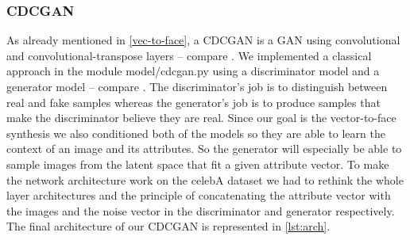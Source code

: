 \documentclass[12pt, a4paper]{article}
\begin{document}
\subsubsection{CDCGAN}
As already mentioned in \ref{vec-to-face}, a CDCGAN is a GAN using convolutional and convolutional-transpose layers
-- compare \cite{dcgan}.
We implemented a classical approach in the module model/cdcgan.py using a discriminator model and a generator model --
compare \cite{gan}.
The discriminator's job is to distinguish between real and fake samples whereas the generator's job is to produce samples
that make the discriminator believe they are real.
Since our goal is the vector-to-face synthesis we also conditioned both of the models so they are able to learn the
context of an image and its attributes.
So the generator will especially be able to sample images from the latent space that fit a given attribute vector.
To make the network architecture work on the celebA dataset we had to rethink the whole layer architectures and the
principle of concatenating the attribute vector with the images and the noise vector in the discriminator and generator
respectively.
The final architecture of our CDCGAN is represented in \ref{lst:arch}.
\end{document}
